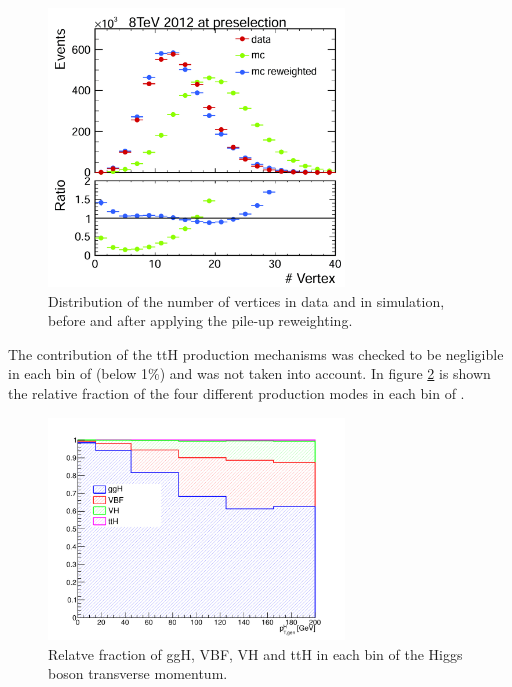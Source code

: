 \begin{figure}[htb]
\centering
\includegraphics[width=0.7\textwidth]{images/nvertex.pdf}
\caption{Distribution of the number of vertices in data and in simulation, before and after applying the pile-up reweighting.}\label{fig:nvertex}
\end{figure}


The contribution of the ttH production mechanisms was checked to be negligible in each bin of \pth (below 1\%) and was not taken into account. In figure \ref{fig:signal_comp} is shown the relative fraction of the four different production modes in each bin of \pth.

\begin{figure}[htb]
\centering
\includegraphics[width=0.7\textwidth]{images/signal_composition_ttH.pdf}
\caption{Relatve fraction of ggH, VBF, VH and ttH in each bin of the Higgs boson transverse momentum.}\label{fig:signal_comp}
\end{figure}
